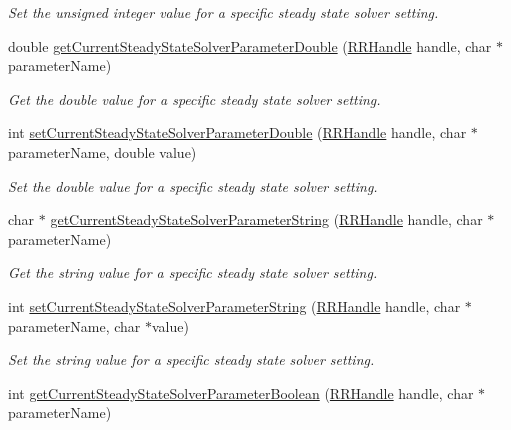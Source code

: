 \begin{DoxyCompactItemize}
\begin{DoxyCompactList}\small\item\em Set the unsigned integer value for a specific steady state solver setting. \end{DoxyCompactList}\item 
double \hyperlink{group__simopts_gaef590828bd962f47e941ca74b09a93ac}{get\+Current\+Steady\+State\+Solver\+Parameter\+Double} (\hyperlink{rrc__types_8h_a1d68f0592372208fa5a5f2799ea4b3ae}{R\+R\+Handle} handle, char $\ast$parameter\+Name)
\begin{DoxyCompactList}\small\item\em Get the double value for a specific steady state solver setting. \end{DoxyCompactList}\item 
int \hyperlink{group__simopts_ga6487a043a634ea934606bb7b784403d5}{set\+Current\+Steady\+State\+Solver\+Parameter\+Double} (\hyperlink{rrc__types_8h_a1d68f0592372208fa5a5f2799ea4b3ae}{R\+R\+Handle} handle, char $\ast$parameter\+Name, double value)
\begin{DoxyCompactList}\small\item\em Set the double value for a specific steady state solver setting. \end{DoxyCompactList}\item 
char $\ast$ \hyperlink{group__simopts_gab55ff5d92aab50f66e969d4ce8aa53fe}{get\+Current\+Steady\+State\+Solver\+Parameter\+String} (\hyperlink{rrc__types_8h_a1d68f0592372208fa5a5f2799ea4b3ae}{R\+R\+Handle} handle, char $\ast$parameter\+Name)
\begin{DoxyCompactList}\small\item\em Get the string value for a specific steady state solver setting. \end{DoxyCompactList}\item 
int \hyperlink{group__simopts_ga55010e4ed7f2612113ebbb894473c2f9}{set\+Current\+Steady\+State\+Solver\+Parameter\+String} (\hyperlink{rrc__types_8h_a1d68f0592372208fa5a5f2799ea4b3ae}{R\+R\+Handle} handle, char $\ast$parameter\+Name, char $\ast$value)
\begin{DoxyCompactList}\small\item\em Set the string value for a specific steady state solver setting. \end{DoxyCompactList}\item 
int \hyperlink{group__simopts_ga079741650e3df582e5b51147bb8b47d8}{get\+Current\+Steady\+State\+Solver\+Parameter\+Boolean} (\hyperlink{rrc__types_8h_a1d68f0592372208fa5a5f2799ea4b3ae}{R\+R\+Handle} handle, char $\ast$parameter\+Name)

\end{DoxyCompactItemize}
